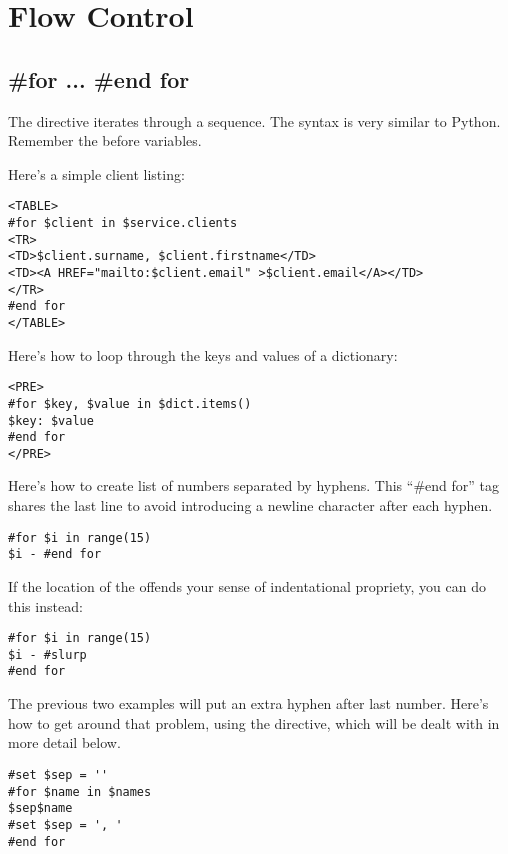 \section{Flow Control}
\label{flowControl}


\subsection{\#for ... \#end for}
\label{flowControl.for}

The  directive iterates through a sequence.  The syntax is very
similar to Python.  Remember the \code{\$} before variables.

Here's a simple client listing:
\begin{verbatim}
<TABLE>
#for $client in $service.clients
<TR>
<TD>$client.surname, $client.firstname</TD>
<TD><A HREF="mailto:$client.email" >$client.email</A></TD>
</TR>
#end for
</TABLE>
\end{verbatim}

Here's how to loop through the  keys and values of a dictionary:
\begin{verbatim}
<PRE>
#for $key, $value in $dict.items()
$key: $value
#end for
</PRE>
\end{verbatim}

Here's how to create list of numbers separated by hyphens. This ``\#end for''
tag shares the last line to avoid introducing a newline character after each
hyphen.  
\begin{verbatim}
#for $i in range(15)
$i - #end for
\end{verbatim}

If the location of the  offends your sense of indentational
propriety, you can do this instead:
\begin{verbatim}
#for $i in range(15)
$i - #slurp
#end for
\end{verbatim}


The previous two examples will put an extra hyphen after last number.  Here's
how to get around that problem, using the  directive, which will be
dealt with in more detail below.
\begin{verbatim}
#set $sep = '' 
#for $name in $names 
$sep$name 
#set $sep = ', ' 
#end for 
\end{verbatim}

